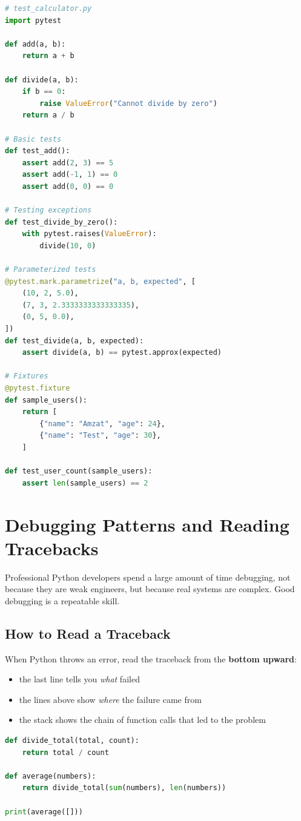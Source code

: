 \documentclass[12pt, a4paper, oneside]{book}
\begin{document}
\begin{lstlisting}[language=Python, caption={Testing with pytest}]
# test_calculator.py
import pytest

def add(a, b):
    return a + b

def divide(a, b):
    if b == 0:
        raise ValueError("Cannot divide by zero")
    return a / b

# Basic tests
def test_add():
    assert add(2, 3) == 5
    assert add(-1, 1) == 0
    assert add(0, 0) == 0

# Testing exceptions
def test_divide_by_zero():
    with pytest.raises(ValueError):
        divide(10, 0)

# Parameterized tests
@pytest.mark.parametrize("a, b, expected", [
    (10, 2, 5.0),
    (7, 3, 2.3333333333333335),
    (0, 5, 0.0),
])
def test_divide(a, b, expected):
    assert divide(a, b) == pytest.approx(expected)

# Fixtures
@pytest.fixture
def sample_users():
    return [
        {"name": "Amzat", "age": 24},
        {"name": "Test", "age": 30},
    ]

def test_user_count(sample_users):
    assert len(sample_users) == 2
\end{lstlisting}

\section{Debugging Patterns and Reading Tracebacks}

Professional Python developers spend a large amount of time debugging, not because they are weak engineers, but because real systems are complex. Good debugging is a repeatable skill.

\subsection{How to Read a Traceback}

When Python throws an error, read the traceback from the \textbf{bottom upward}:
\begin{itemize}[leftmargin=2em]
    \item the last line tells you \emph{what} failed
    \item the lines above show \emph{where} the failure came from
    \item the stack shows the chain of function calls that led to the problem
\end{itemize}

\begin{lstlisting}[language=Python, caption={Reading a traceback}]
def divide_total(total, count):
    return total / count

def average(numbers):
    return divide_total(sum(numbers), len(numbers))

print(average([]))
\end{lstlisting}
\end{document}
